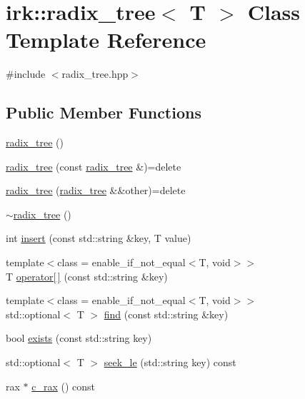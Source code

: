 \hypertarget{classirk_1_1radix__tree}{}\section{irk\+:\+:radix\+\_\+tree$<$ T $>$ Class Template Reference}
\label{classirk_1_1radix__tree}


{\ttfamily \#include $<$radix\+\_\+tree.\+hpp$>$}

\subsection*{Public Member Functions}
\begin{DoxyCompactItemize}
\item 
\mbox{\hyperlink{classirk_1_1radix__tree_a276f716ad240e75b4a3b2d1ee7c06663}{radix\+\_\+tree}} ()
\item 
\mbox{\hyperlink{classirk_1_1radix__tree_aaffbfdc0d841373868a7ca6672d0999f}{radix\+\_\+tree}} (const \mbox{\hyperlink{classirk_1_1radix__tree}{radix\+\_\+tree}} \&)=delete
\item 
\mbox{\hyperlink{classirk_1_1radix__tree_a83abd054182dee10a2a0f36c3974d420}{radix\+\_\+tree}} (\mbox{\hyperlink{classirk_1_1radix__tree}{radix\+\_\+tree}} \&\&other)=delete
\item 
\mbox{\hyperlink{classirk_1_1radix__tree_a32491327f9b61b14c88f38ef6fd09a9f}{$\sim$radix\+\_\+tree}} ()
\item 
int \mbox{\hyperlink{classirk_1_1radix__tree_ad65f1ba2c32c59c3b6fd2ca220a9fc7f}{insert}} (const std\+::string \&key, T value)
\item 
{\footnotesize template$<$class  = enable\+\_\+if\+\_\+not\+\_\+equal$<$\+T, void$>$$>$ }\\T \mbox{\hyperlink{classirk_1_1radix__tree_af46c8d034084c54b33bb761ec96588d4}{operator\mbox{[}$\,$\mbox{]}}} (const std\+::string \&key)
\item 
{\footnotesize template$<$class  = enable\+\_\+if\+\_\+not\+\_\+equal$<$\+T, void$>$$>$ }\\std\+::optional$<$ T $>$ \mbox{\hyperlink{classirk_1_1radix__tree_a7a8f4484dd52244e712e204288e00b15}{find}} (const std\+::string \&key)
\item 
bool \mbox{\hyperlink{classirk_1_1radix__tree_aaedca67d183c9b0b4f64c1b6ae240d7b}{exists}} (const std\+::string key)
\item 
std\+::optional$<$ T $>$ \mbox{\hyperlink{classirk_1_1radix__tree_aec3e27fbf3cd3f0e2d75183d392b0946}{seek\+\_\+le}} (std\+::string key) const
\item 
rax $\ast$ \mbox{\hyperlink{classirk_1_1radix__tree_aed4255775e1f9f2a4647e80a408c9946}{c\+\_\+rax}} () const
\end{DoxyCompactItemize}


